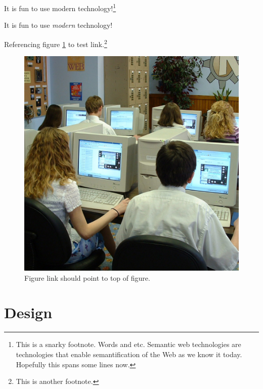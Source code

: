\documentclass[final,11pt,baselinegrid]{../../uit-thesis}
\begin{document}
It is fun to use modern  technology!\footnote{This is a snarky
footnote. Words and etc. Semantic web technologies are technologies that enable
semantification of the Web as we know it today. Hopefully this spans some lines
now.}

It is fun to use \emph{modern } technology!

Referencing figure \ref{fig:ex} to test link.\footnote{This is another
footnote.}

\begin{figure}\label{fig:ex}
\centering
\includegraphics[scale=0.1]{748443511_095ae916df_o.jpg}
\caption{Figure link should point to top of figure.}
\end{figure}

\chapter{Design}
\lipsum[8-10]

\backmatter
\end{document}
